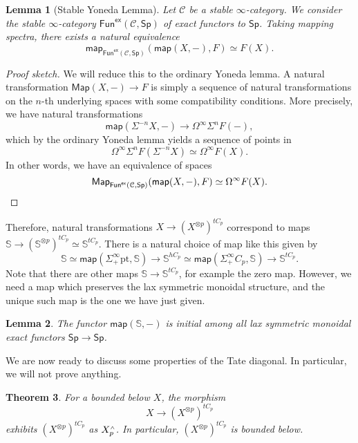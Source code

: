 \documentclass[10pt]{amsart}
\newtheorem{thm}{Theorem}[subsection]
\newtheorem{lem}[thm]{Lemma}
\theoremstyle{definition}
\theoremstyle{remark}
\theoremstyle{plain}
\theoremstyle{definition}
\theoremstyle{remark}
\newcommand{\bS}{\mathbb{S}}
\newcommand{\mc}[1]{\mathcal{#1}}
\newcommand{\mr}[1]{\mathrm{#1}}
\newcommand{\ms}[1]{\mathsf{#1}}
\newcommand{\1}{\mathbf{1}}
\newcommand{\2}{\mathbf{2}}
\newcommand{\3}{\mathbf{3}}
\newcommand{\pt}{\mr{pt}}
\newcommand{\sw}{\mathsmaller{\wedge}}
\begin{document}
\begin{lem}[Stable Yoneda Lemma]
    Let $\mc{C}$ be a stable $\infty$-category. We consider the stable $\infty$-category $\ms{Fun}^{\ms{ex}}(\mc{C}, \ms{Sp})$ of exact functors to $\ms{Sp}$. Taking mapping spectra, there exists a natural equivalence
    \[ \ms{map}_{\ms{Fun}^{\ms{ex}}(\mc{C}, \ms{Sp})} (\ms{map}(X, -), F) \simeq F(X). \]
\end{lem}

\begin{proof}[Proof sketch]
    We will reduce this to the ordinary Yoneda lemma. A natural transformation $\ms{Map}(X, -) \to F$ is simply a sequence of natural transformations on the $n$-th underlying spaces with some compatibility conditions. More precisely, we have natural transformations
    \[ \ms{map}(\Sigma^{-n} X, -) \to \Omega^{\infty} \Sigma^n F(-), \]
    which by the ordinary Yoneda lemma yields a sequence of points in 
    \[ \Omega^{\infty} \Sigma^n F(\Sigma^{-n} X)  \simeq \Omega^{\infty} F(X). \]
    In other words, we have an equivalence of spaces
    \[ \ms{Map}_{\ms{Fun}^{\ms{ex}}(\mc{C}, \ms{Sp})} (\ms{map}(X, -), F) \simeq \Omega^{\infty} F(X). \qedhere \]
\end{proof}

Therefore, natural transformations $X \to (X^{\otimes p})^{t C_p}$ correspond to maps $\bS \to (\bS^{\otimes p})^{t C_p} \simeq \bS^{t C_p}$. There is a natural choice of map like this given by
\[ \bS \simeq \ms{map}(\Sigma_+^{\infty} \pt, \bS) \to \bS^{h C_p} \simeq \ms{map}(\Sigma_+^{\infty} C_p, \bS) \to \bS^{t C_p}. \]
Note that there are other maps $\bS \to \bS^{t C_p}$, for example the zero map. However, we need a map which preserves the lax symmetric monoidal structure, and the unique such map is the one we have just given.

\begin{lem}
    The functor $\ms{map}(\bS, -)$ is initial among all lax symmetric monoidal exact functors $\ms{Sp} \to \ms{Sp}$.
\end{lem}

We are now ready to discuss some properties of the Tate diagonal. In particular, we will not prove anything.

\begin{thm}
    For a bounded below $X$, the morphism
    \[ X \to (X^{\otimes p})^{t C_p} \]
    exhibits $(X^{\otimes p})^{t C_p}$ as $X_p^{\sw}$. In particular, $(X^{\otimes p})^{t C_p}$ is bounded below.
\end{thm}
\end{document}
